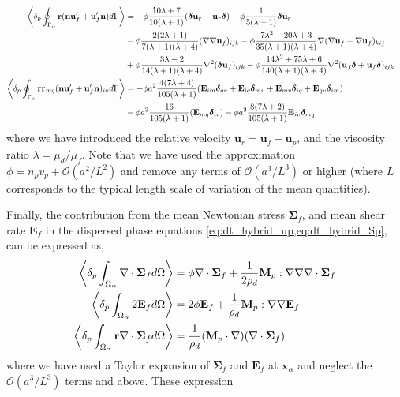 \begin{align}
    \\
    \pSavg{ \textbf{r}(\textbf{n} \textbf{u}_f' + \textbf{u}_f' \textbf{n})}
    &=
    -\phi \frac{10\lambda +7}{10(\lambda+1)}
    (\bm\delta \textbf{u}_r + \textbf{u}_r \bm\delta)
    - \phi  \frac{1}{5(\lambda+1)}\bm\delta \textbf{u}_r\\
    &-  \phi \frac{2(2\lambda+1)}{7(\lambda+1)(\lambda+4)}(\grad\grad \textbf{u}_f)_{ijk}
    -  \phi \frac{7\lambda^2+20\lambda+3}{35(\lambda+1)(\lambda+4)}\grad(\grad \textbf{u}_f+\grad \textbf{u}_f)_{kij}\nonumber\\
    &+  \phi \frac{3\lambda-2}{14(\lambda+1)(\lambda+4)}\grad^2(\bm\delta\textbf{u}_f)_{ijk}
    -  \phi \frac{14\lambda^2+75\lambda+6}{140(\lambda+1)(\lambda+4)}\grad^2 (\textbf{u}_f \bm\delta + \textbf{u}_f \bm\delta)_{ijk}\nonumber
    \label{eq:secondUN}\\
    \pSavg{ \textbf{rr}_{mq}(\textbf{n} \textbf{u}_f' + \textbf{u}_f' \textbf{n})_{iv}}
    &=
    -\phi a^2 \frac{4(7\lambda+4)}{105(\lambda+1)}
    (\textbf{E}_{im} \bm\delta_{qv}
    +\textbf{E}_{iq}\bm\delta_{mv}
    + \textbf{E}_{mv} \bm\delta_{iq}
    + \textbf{E}_{qv}\bm\delta_{im}
    )
    \\
    &
    -\phi a^2 
    \frac{16}{105(\lambda+1)}(\textbf{E}_{mq}\bm\delta_{iv})
    -\phi a^2 \frac{8(7\lambda+2)}{105(\lambda+1)}\textbf{E}_{iv}\bm\delta_{mq}
\end{align}
where we have introduced the relative velocity $\textbf{u}_r = \textbf{u}_f - \textbf{u}_p$, and the viscosity ratio $\lambda = \mu_d/\mu_f$. 
Note that we have used the approximation $\phi=n_pv_p + \mathcal{O}(a^2/L^2)$ and remove any terms of $\mathcal{O}(a^3/L^3)$ or higher (where $L$ corresponds to the typical length  scale of variation of the mean quantities). 

Finally, the contribution from the mean Newtonian stress $\bm\Sigma_f$, and mean shear rate $\textbf{E}_f$ in the dispersed phase equations \eqref{eq:dt_hybrid_up,eq:dt_hybrid_Sp}, can be expressed as\citep{zhang1997momentum,morel2015mathematical}, 
\begin{align}
    \pOavg{\div\bm\Sigma_f} 
    &= \phi\div\bm\Sigma_f  
    +\frac{1}{2\rho_d}\textbf{M}_p:\grad\grad\div\bm\Sigma_f 
    \\
    \pOavg{2\textbf{E}_f} 
    &= 2\phi\textbf{E}_f 
    +
    \frac{1}{\rho_d }\textbf{M}_p :\grad\grad \textbf{E}_f\\
    \pOavg{\textbf{r}\div\bm\Sigma_f} 
    &= 
    \frac{1}{\rho_d}(\textbf{M}_p\cdot
    \grad) (\div\bm\Sigma_f )
    \label{eq:mean_contributions}
\end{align}
where we have used a Taylor expansion of $\bm\Sigma_f$ and $\textbf{E}_f$ at $\textbf{x}_\alpha$ and neglect the $\mathcal{O}(a^3/L^3)$ terms and above. 
These expression 


